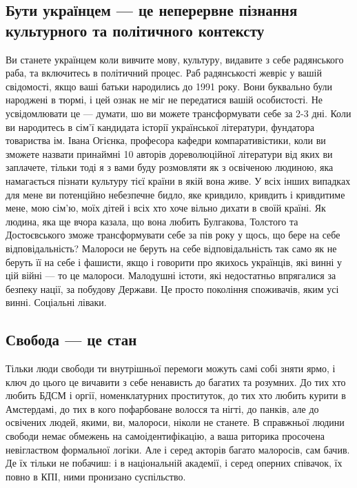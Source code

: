 \subsection{Бути українцем --- це неперервне пізнання культурного та політичного контексту}
Ви станете українцем коли вивчите мову, культуру, видавите з себе радянського раба,
та включитесь в політичний процес. Раб радянськості жевріє у вашій свідомості,
якщо ваші батьки народились до 1991 року. Вони буквально були народжені в тюрмі,
і цей ознак не міг не передатися вашій особистості. Не усвідомлювати це --- думати,
шо ви можете трансформувати себе за 2-3 дні. Коли ви народитесь в сім'ї кандидата
історії української літератури, фундатора товариства ім. Івана Огієнка, професора
кафедри компаративістики, коли ви зможете назвати принаймні 10 авторів дореволюційної
літератури від яких ви заплачете, тільки тоді я з вами буду розмовляти як з освіченою
людиною, яка намагається пізнати культуру тієї країни в якій вона живе. У всіх інших
випадках для мене ви потенційно небезпечне бидло, яке кривдило, кривдить і кривдитиме
мене, мою сім'ю, моїх дітей і всіх хто хоче вільно дихати в своїй країні. Як людина,
яка ще вчора казала, що вона любить Булгакова, Толстого та Достоєвського зможе
трансформувати себе за пів року у щось, що бере на себе відповідальність?
Малороси не беруть на себе відповідальність так само як не беруть її на себе
і фашисти, якщо і говорити про якихось українців, які винні у цій війні --- то
це малороси. Малодушні істоти, які недостатньо впрягалися за безпеку нації,
за побудову Держави. Це просто покоління споживачів, яким усі винні. Соціальні ліваки.

\subsection{Свобода --- це стан}

Тільки люди свободи ти внутрішньої перемоги можуть самі собі зняти ярмо,
і ключ до цього це вичавити з себе ненависть до багатих та розумних. До
тих хто любить БДСМ і оргії, номенклатурних проституток, до тих хто любить
курити в Амстердамі, до тих в кого пофарбоване волосся та нігті, до панків,
але до освічених людей, якими, ви, малороси, ніколи не станете. В справжньої
людини свободи немає обмежень на самоідентифікацію, а ваша риторика просочена
невіглаством формальної логіки. Але і серед акторів багато малоросів, сам бачив.
Де їх тільки не побачиш: і в національній академії, і серед оперних співачок,
їх повно в КПІ, ними пронизано суспільство.

